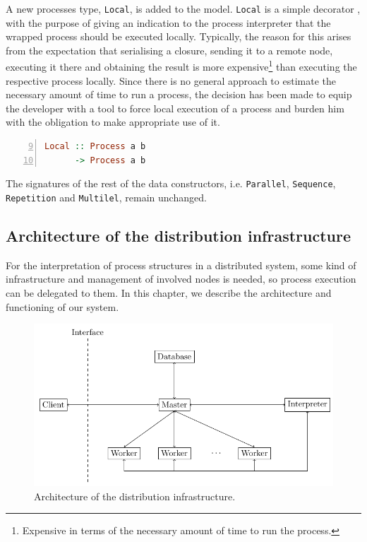 A new processes type, \texttt{Local}, is added to the model. \texttt{Local} is a simple decorator \cite{Gamma:1995:DPE:186897}, with the purpose of giving an indication to the process interpreter that the wrapped process should be executed locally. Typically, the reason for this arises from the expectation that serialising a closure, sending it to a remote node, executing it there and obtaining the result is more expensive\footnote{Expensive in terms of the necessary amount of time to run the process.} than executing the respective process locally. Since there is no general approach to estimate the necessary amount of time to run a process, the decision has been made to equip the developer with a tool to force local execution of a process and burden him with the obligation to make appropriate use of it.
\begin{lstlisting}[language=Haskell,caption=Signature of the additional \texttt{Local} data constructor.,numbers=left,frame=bt,firstnumber=9]
Local :: Process a b
      -> Process a b
\end{lstlisting}

The signatures of the rest of the data constructors, i.e. \texttt{Parallel}, \texttt{Sequence}, \texttt{Repetition} and \texttt{Multilel}, remain unchanged.

\subsection{Architecture of the distribution infrastructure}
\label{chp:infrastructure}
For the interpretation of process structures in a distributed system, some kind of infrastructure and management of involved nodes is needed, so process execution can be delegated to them. In this chapter, we describe the architecture and functioning of our system.
\begin{figure}[h!]
  \centering
  \includegraphics[width=\textwidth]{img/architecture.pdf}
  \caption{Architecture of the distribution infrastructure.}
  \label{fig:architecture}
\end{figure}

